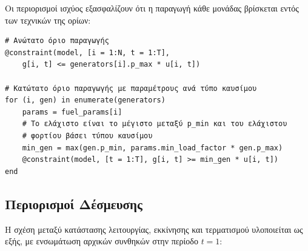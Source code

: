 Οι περιορισμοί ισχύος εξασφαλίζουν ότι η παραγωγή κάθε μονάδας βρίσκεται εντός των τεχνικών της ορίων:

\begin{samepage}
\begin{verbatim}
# Ανώτατο όριο παραγωγής
@constraint(model, [i = 1:N, t = 1:T], 
    g[i, t] <= generators[i].p_max * u[i, t])

# Κατώτατο όριο παραγωγής με παραμέτρους ανά τύπο καυσίμου
for (i, gen) in enumerate(generators)
    params = fuel_params[i]
    # Το ελάχιστο είναι το μέγιστο μεταξύ p_min και του ελάχιστου 
    # φορτίου βάσει τύπου καυσίμου
    min_gen = max(gen.p_min, params.min_load_factor * gen.p_max)
    @constraint(model, [t = 1:T], g[i, t] >= min_gen * u[i, t])
end
\end{verbatim}
\end{samepage}

\subsection{Περιορισμοί Δέσμευσης}
\label{subsec:impl-uc-commitment-constraints}

Η σχέση μεταξύ κατάστασης λειτουργίας, εκκίνησης και τερματισμού υλοποιείται ως εξής, με ενσωμάτωση αρχικών συνθηκών στην περίοδο $t=1$:

